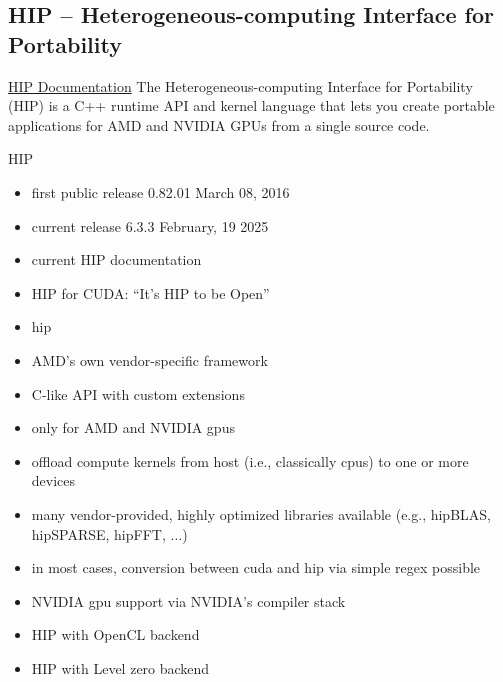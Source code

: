 \subsection{HIP -- Heterogeneous-computing Interface for Portability}
\label{sec:frameworks:hip}

\begin{quotebox}{\href{https://rocm.docs.amd.com/projects/HIP/en/latest/index.html\#hip-documentation}{HIP Documentation}}
    The Heterogeneous-computing Interface for Portability (HIP) is a C++ runtime API and kernel language that lets you create portable applications for AMD and NVIDIA GPUs from a single source code.
\end{quotebox}

HIP
\begin{itemize}
    \item first public release 0.82.01 March 08, 2016~\cite{advanced_micro_devices_release_2016}
    \item current release 6.3.3 February, 19 2025~\cite{advanced_micro_devices_release_2025}
    \item current HIP documentation~\cite{advanced_micro_devices_hip_nodate}
    \item HIP for CUDA: \enquote{It’s HIP to be Open}~\cite{advanced_micro_devices_its_2016}
\end{itemize}


\begin{itemize}
    \item \acrfull{hip}
    \item AMD's own vendor-specific framework
    \item C-like API with custom extensions 
    \item only for AMD and NVIDIA \glspl{gpu}
    \item offload compute kernels from host (i.e., classically \glspl{cpu}) to one or more devices
    \item many vendor-provided, highly optimized libraries available (e.g., hipBLAS, hipSPARSE, hipFFT, $\dots$)
    \item in most cases, conversion between \gls{cuda} and \gls{hip} via simple regex possible
    \item NVIDIA \gls{gpu} support via NVIDIA's compiler stack
    \item HIP with OpenCL backend~\cite{babej_hipcl_2020}
    \item HIP with Level zero backend~\cite{singer_hiplz_2023}
\end{itemize}

